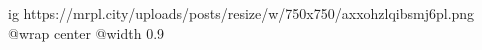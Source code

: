  
 
 
 
 

\ifcmt
  ig https://mrpl.city/uploads/posts/resize/w/750x750/axxohzlqibsmj6pl.png
  @wrap center
  @width 0.9
\fi
